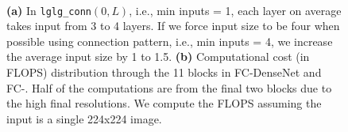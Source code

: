 \begin{figure}
    \centering
    ~

    \cprotect\caption{\textbf{(a)} In \verb=lglg_conn=$(0,L)$, i.e., min inputs = 1, each layer on average takes input from 3 to 4 layers. If we force input size to be four when possible using \logdense connection pattern, i.e., min inputs = 4, we increase the average input size by 1 to 1.5. \textbf{(b)} Computational cost (in FLOPS) distribution through the 11 blocks in FC-DenseNet and FC-\logdense. Half of the computations are from the final two blocks due to the high final resolutions. We compute the FLOPS assuming the input is a single 224x224 image.}
    \label{fig:my_label}
\end{figure}
